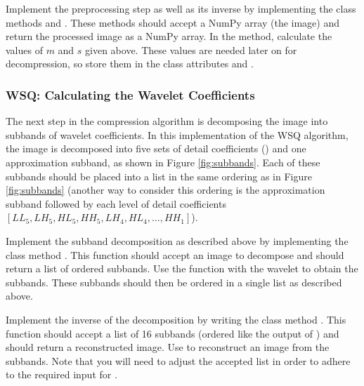 \begin{problem}
Implement the preprocessing step as well as its inverse by implementing the class methods  and .
These methods should accept a NumPy array (the image) and return the processed image as a NumPy array.
In the  method, calculate the values of $m$ and $s$ given above.
These values are needed later on for decompression, so store them in the class attributes  and .
\end{problem}

\subsubsection*{WSQ: Calculating the Wavelet Coefficients}
The next step in the compression algorithm is decomposing the image into subbands of wavelet coefficients.
In this implementation of the WSQ algorithm, the image is decomposed into five sets of detail coefficients () and one approximation subband, as shown in Figure \ref{fig:subbands}.
Each of these subbands should be placed into a list in the same ordering as in Figure \ref{fig:subbands} (another way to consider this ordering is the approximation subband followed by
each level of detail coefficients $[LL_5, LH_5, HL_5, HH_5, LH_4, HL_4,\dots ,HH_1]$).

\begin{problem}
Implement the subband decomposition as described above by implementing the class method .
This function should accept an image to decompose and should return a list of ordered subbands.
Use the function  with the  wavelet to obtain the subbands.
These subbands should then be ordered in a single list as described above.

Implement the inverse of the decomposition by writing the class method .
This function should accept a list of 16 subbands (ordered like the output of ) and should return a reconstructed image.
Use  to reconstruct an image from the subbands.
Note that you will need to adjust the accepted list in order to adhere to the required input for .
\end{problem}

